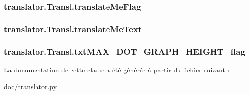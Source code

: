 \subsubsection[{translate\+Me\+Flag}]{\setlength{\rightskip}{0pt plus 5cm}translator.\+Transl.\+translate\+Me\+Flag}\label{classtranslator_1_1_transl_a35ef06fb423fad142c3b1cabbff55380}
\hypertarget{classtranslator_1_1_transl_a9e22f71da9dda780a278ea93a85fc8dc}{}
\subsubsection[{translate\+Me\+Text}]{\setlength{\rightskip}{0pt plus 5cm}translator.\+Transl.\+translate\+Me\+Text}\label{classtranslator_1_1_transl_a9e22f71da9dda780a278ea93a85fc8dc}
\hypertarget{classtranslator_1_1_transl_a896359e684a202535f3e97911140eac6}{}
\subsubsection[{txt\+M\+A\+X\+\_\+\+D\+O\+T\+\_\+\+G\+R\+A\+P\+H\+\_\+\+H\+E\+I\+G\+H\+T\+\_\+flag}]{\setlength{\rightskip}{0pt plus 5cm}translator.\+Transl.\+txt\+M\+A\+X\+\_\+\+D\+O\+T\+\_\+\+G\+R\+A\+P\+H\+\_\+\+H\+E\+I\+G\+H\+T\+\_\+flag}\label{classtranslator_1_1_transl_a896359e684a202535f3e97911140eac6}


La documentation de cette classe a été générée à partir du fichier suivant \+:\begin{DoxyCompactItemize}
\item 
doc/\hyperlink{translator_8py}{translator.\+py}\end{DoxyCompactItemize}
